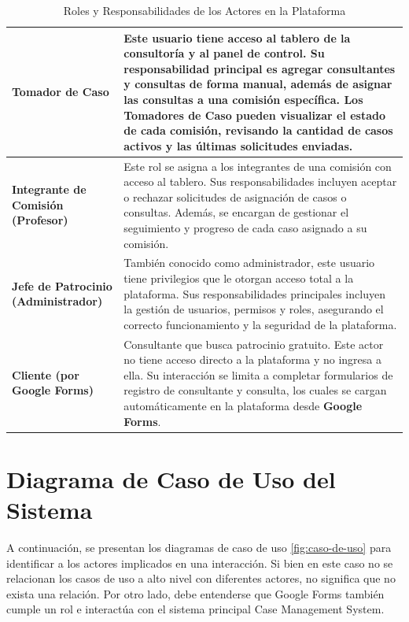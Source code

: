 \begin{table}[H]
    \centering
    \begin{tabular}{|p{3cm}|p{12cm}|}
        \hline
        \textbf{Tomador de Caso} & Este usuario tiene acceso al tablero de la consultoría y al panel de control. Su responsabilidad principal es agregar consultantes y consultas de forma manual, además de asignar las consultas a una comisión específica. Los Tomadores de Caso pueden visualizar el estado de cada comisión, revisando la cantidad de casos activos y las últimas solicitudes enviadas.\\
        \hline
        \textbf{Integrante de Comisión (Profesor)} & Este rol se asigna a los integrantes de una comisión con acceso al tablero. Sus responsabilidades incluyen aceptar o rechazar solicitudes de asignación de casos o consultas. Además, se encargan de gestionar el seguimiento y progreso de cada caso asignado a su comisión.\\
        \hline
        \textbf{Jefe de Patrocinio (Administrador)} & También conocido como administrador, este usuario tiene privilegios que le otorgan acceso total a la plataforma. Sus responsabilidades principales incluyen la gestión de usuarios, permisos y roles, asegurando el correcto funcionamiento y la seguridad de la plataforma.\\
        \hline
        \textbf{Cliente (por Google Forms)} & Consultante que busca patrocinio gratuito. Este actor no tiene acceso directo a la plataforma y no ingresa a ella. Su interacción se limita a completar formularios de registro de consultante y consulta, los cuales se cargan automáticamente en la plataforma desde \textbf{Google Forms}.\\
        \hline

    \end{tabular}
    \caption{Roles y Responsabilidades de los Actores en la Plataforma}
    \label{tab:roles-responsabilidades}
\end{table}


\section{Diagrama de Caso de Uso del Sistema}
A continuación, se presentan los diagramas de caso de uso \ref{fig:caso-de-uso} para identificar a los actores implicados en una interacción. Si bien en este caso no se relacionan los casos de uso a alto nivel con diferentes actores, no significa que no exista una relación. Por otro lado, debe entenderse que Google Forms también cumple un rol e interactúa con el sistema principal Case Management System.

